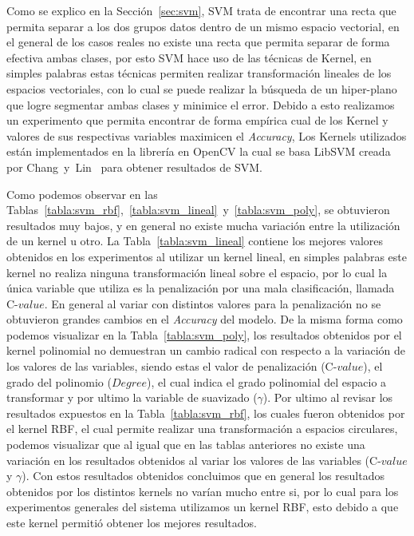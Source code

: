 Como se explico en la Sección~\ref{sec:svm}, SVM trata de encontrar una recta que permita separar a los dos grupos datos dentro de un mismo espacio vectorial, en el general de los casos reales no existe una recta que permita separar de forma efectiva ambas clases, por esto SVM hace uso de las técnicas de Kernel, en simples palabras estas técnicas permiten realizar transformación lineales de los espacios vectoriales, con lo cual se puede realizar la búsqueda de un hiper-plano que logre segmentar ambas clases y minimice el error. Debido a esto realizamos un experimento que permita encontrar de forma empírica cual de los Kernel y valores de sus respectivas variables maximicen el \textit{Accuracy}, Los Kernels utilizados están implementados en la librería en OpenCV la cual se basa LibSVM creada por Chang~y~Lin~\cite{Chang2011} para obtener resultados de SVM.


Como podemos observar en las Tablas~\ref{tabla:svm_rbf},~\ref{tabla:svm_lineal}~y~\ref{tabla:svm_poly}, se obtuvieron resultados muy bajos, y en general no existe mucha variación entre la utilización de un kernel u otro. La Tabla~\ref{tabla:svm_lineal} contiene los mejores valores obtenidos en los experimentos al utilizar un kernel lineal, en simples palabras este kernel no realiza ninguna transformación lineal sobre el espacio, por lo cual la única variable que utiliza es la penalización por una mala clasificación, llamada C-$value$. En general al variar con distintos valores para la penalización no se obtuvieron grandes cambios en el \textit{Accuracy} del modelo. De la misma forma como podemos visualizar en la Tabla~\ref{tabla:svm_poly}, los resultados obtenidos por el kernel polinomial no demuestran un cambio radical con respecto a la variación de los valores de las variables, siendo estas el valor de penalización (C-$value$), el grado del polinomio ($Degree$), el cual indica el grado polinomial del espacio a transformar y por ultimo la variable de suavizado ($\gamma$). Por ultimo al revisar los resultados expuestos en la Tabla~\ref{tabla:svm_rbf}, los cuales fueron obtenidos por el kernel RBF, el cual permite realizar una transformación a espacios circulares, podemos visualizar que al igual que en las tablas anteriores no existe una variación en los resultados obtenidos al variar los valores de las variables (C-$value$ y $\gamma$). Con estos resultados obtenidos concluimos que en general los resultados obtenidos por los distintos kernels no varían mucho entre si, por lo cual para los experimentos generales del sistema utilizamos un kernel RBF, esto debido a que este kernel permitió obtener los mejores resultados.

